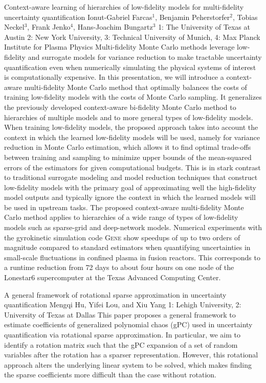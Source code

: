 \vspace{1.5ex}
\abs
{Context-aware learning of hierarchies of low-fidelity models for multi-fidelity uncertainty quantification}
{Ionut-Gabriel Farcas$^{1}$, Benjamin Peherstorfer$^{2}$, Tobias Neckel$^{3}$, Frank Jenko$^{4}$, Hans-Joachim Bungartz$^{3}$}
{1: The University of Texas at Austin 2: New York University, 3: Technical University of Munich, 4: Max Planck Institute for Plasma Physics}
{Multi-fidelity Monte Carlo methods leverage low-fidelity and surrogate models for variance
	reduction to make tractable uncertainty quantification even when numerically simulating the
	physical systems of interest is computationally expensive.
	In this presentation, we will introduce a context-aware multi-fidelity Monte Carlo method that
	optimally balances the costs of training low-fidelity models with the costs of Monte Carlo
	sampling. 
	It generalizes the previously developed context-aware bi-fidelity Monte Carlo method 
	to hierarchies of multiple models and to more general types of low-fidelity models.
	When training low-fidelity models, the proposed approach takes into account the context in which
	the learned low-fidelity models will be used, namely for variance reduction in Monte Carlo
	estimation, which allows it to find optimal trade-offs between training and sampling to minimize
	upper bounds of the mean-squared errors of the estimators for given computational budgets. 
	This is in stark contrast to traditional surrogate modeling and model reduction techniques that
	construct low-fidelity models with the primary goal of approximating well the high-fidelity model
	outputs and typically ignore the context in which the learned models will be used in upstream
	tasks. 
	The proposed context-aware multi-fidelity Monte Carlo method applies to hierarchies of a
	wide range of types of low-fidelity models such as sparse-grid and deep-network models. 
	Numerical experiments with the gyrokinetic simulation code \textsc{Gene} show speedups of up to
	two orders of magnitude compared to standard estimators when quantifying uncertainties in small-scale fluctuations in confined plasma in fusion reactors. 
	This corresponds to a runtime reduction from 72 days to about four hours on one node of the
	Lonestar6 supercomputer at the Texas Advanced Computing Center.
}


\vspace{1.5ex}
\abs
{A general framework of rotational sparse approximation in uncertainty quantification}
{Mengqi Hu, Yifei Lou, and Xiu Yang}
{1: Lehigh University, 2: University of Texas at Dallas}
{This paper proposes a general framework to estimate coefficients of generalized  polynomial chaos (gPC) used in uncertainty quantification via rotational sparse approximation. In particular, we aim to identify a rotation matrix such that the gPC expansion of a set of random variables after the rotation has a sparser representation. However, this rotational approach alters the underlying linear system to be solved, which makes finding the sparse coefficients more difficult than the case without rotation.}


